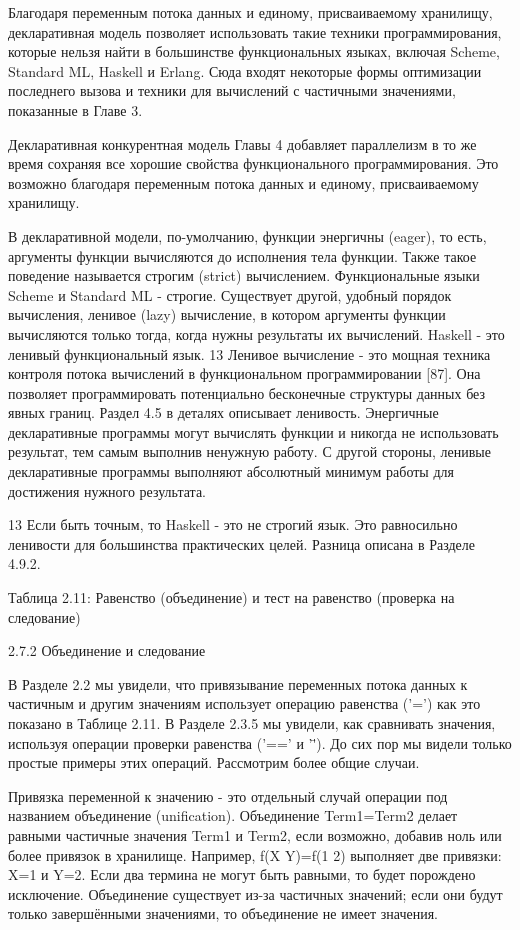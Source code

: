 Благодаря переменным потока данных и единому, присваиваемому хранилищу, декларативная модель позволяет использовать такие техники программирования, которые нельзя найти в большинстве функциональных языках, включая Scheme, Standard ML, Haskell и Erlang. Сюда входят некоторые формы оптимизации последнего вызова и техники для вычислений с частичными значениями, показанные в Главе 3.

Декларативная конкурентная модель Главы 4 добавляет параллелизм в то же время сохраняя все хорошие свойства функционального программирования. Это возможно благодаря переменным потока данных и единому, присваиваемому хранилищу.

В декларативной модели, по-умолчанию, функции энергичны (eager), то есть, аргументы функции вычисляются до исполнения тела функции. Также такое поведение называется строгим (strict) вычислением. Функциональные языки Scheme и Standard ML - строгие. Существует другой, удобный порядок вычисления, ленивое (lazy) вычисление, в котором аргументы функции вычисляются только тогда, когда нужны результаты их вычислений. Haskell - это ленивый функциональный язык. 13 Ленивое вычисление - это мощная техника контроля потока вычислений в функциональном программировании [87]. Она позволяет программировать потенциально бесконечные структуры данных без явных границ. Раздел 4.5 в деталях описывает ленивость. Энергичные декларативные программы могут вычислять функции и никогда не использовать результат, тем самым выполнив ненужную работу. С другой стороны, ленивые декларативные программы выполняют абсолютный минимум работы для достижения нужного результата.

13 Если быть точным, то Haskell - это не строгий язык. Это равносильно ленивости для большинства практических целей. Разница описана в Разделе 4.9.2.

Таблица 2.11: Равенство (объединение) и тест на равенство (проверка на следование)

2.7.2 Объединение и следование

В Разделе 2.2 мы увидели, что привязывание переменных потока данных к частичным и другим значениям использует операцию равенства ('=') как это показано в Таблице 2.11. В Разделе 2.3.5 мы увидели, как сравнивать значения, используя операции проверки равенства ('==' и '\='). До сих пор мы видели только простые примеры этих операций. Рассмотрим более общие случаи.

Привязка переменной к значению - это отдельный случай операции под названием объединение (unification). Объединение Term1=Term2 делает равными частичные значения Term1 и Term2, если возможно, добавив ноль или более привязок в хранилище. Например, f(X Y)=f(1 2) выполняет две привязки: X=1 и Y=2. Если два термина не могут быть равными, то будет порождено исключение. Объединение существует из-за частичных значений; если они будут только завершёнными значениями, то объединение не имеет значения.


